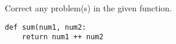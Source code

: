 Correct any problem(s) in the given function.
\begin{verbatim}
def sum(num1, num2:
    return num1 ++ num2
\end{verbatim}
